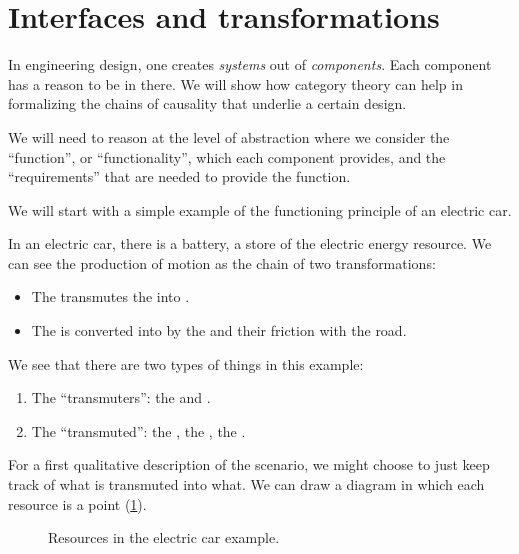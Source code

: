 

\section{Interfaces and transformations}



In engineering design, one creates \emph{systems} out of \emph{components}. Each component has a reason to be in there. We will show how category theory can help in formalizing the chains of causality that underlie a certain design.

We will need to reason at the level of abstraction where we consider the ``function'', or ``functionality'', which each component provides, and the ``requirements'' that are needed to provide the function.

We will start with a simple example of the functioning principle of an electric car.

In an electric car, there is a battery, a store of the electric energy resource. We can see the production of motion as the chain of two transformations:

\begin{itemize}
    \item The \motor transmutes the \electricpower into \rotationalmotion.
    \item The \rotationalmotion is converted into \translationalmotion by the \wheels and their friction with the road.
\end{itemize}

We see that there are two types of things in this example:
\begin{enumerate}
    \item The ``transmuters'': the \motor and \wheels.
    \item The ``transmuted'': the \electricpower, the \rotationalmotion, the \translationalmotion.
\end{enumerate}

For a first qualitative description of the scenario, we might choose to just keep track of what is transmuted into what. We can draw a diagram in which each resource is a point (\cref{fig:e1}).

\begin{figure}[h!]
    \centering
    \caption{Resources in the electric car example. \label{fig:e1} }
\end{figure}




